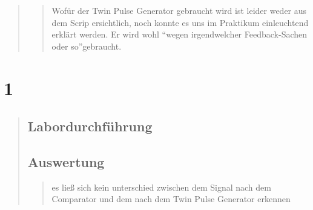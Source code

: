 \begin{quote}
\begin{quote}
        Wofür der Twin Pulse Generator gebraucht wird ist leider weder aus dem Scrip ersichtlich, noch konnte es uns im Praktikum
        einleuchtend erklärt werden. Er wird wohl ``wegen irgendwelcher Feedback-Sachen oder so''\footnotemark gebraucht.
        
    \end{quote}
    
    
\end{quote}



\section{1}
\begin{quote}
    
    
    \subsection{Labordurchführung}
    \begin{quote}
        
        
    \end{quote}
    
    
    
    
    
    \subsection{Auswertung}
    \begin{quote}
        
        
        
        es ließ sich kein unterschied zwischen dem Signal nach dem Comparator und dem nach dem Twin Pulse Generator erkennen
    \end{quote}
    
\end{quote}


